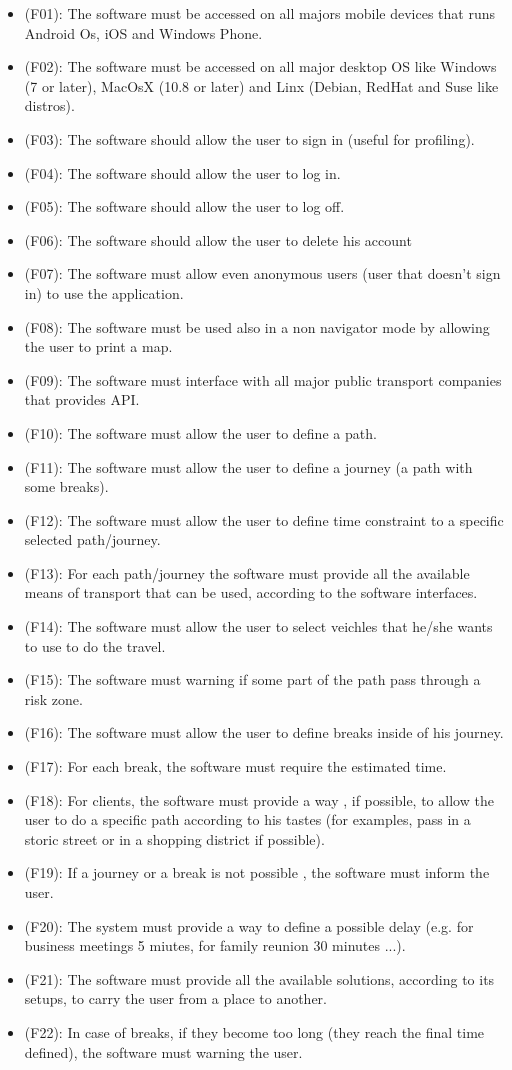 \documentclass[a4paper]{book}
\begin{document}
\begin{itemize}

\item (F01): The software must be accessed on all majors mobile devices that runs Android Os, iOS and Windows Phone.
\item (F02): The software must be accessed on all major desktop OS like Windows (7 or later), MacOsX (10.8 or later) and Linx (Debian, RedHat and Suse like distros).
\item (F03): The software should allow the user to sign in (useful for profiling).
\item (F04): The software should allow the user to log in.
\item (F05): The software should allow the user to log off.
\item (F06): The software should allow the user to delete his account
\item (F07): The software must allow even anonymous users (user that doesn't sign in) to use the application.
\item (F08): The software must be used also in a non navigator mode by allowing the user to print a map.
\item (F09): The software must interface with all major public transport companies that provides API.
\item (F10): The software must allow the user to define a path.
\item (F11): The software must allow the user to define a journey (a path with some breaks).
\item (F12): The software must allow the user to define time constraint to a specific selected path/journey.
\item (F13): For each path/journey the software must provide all the available means of transport that can be used, according to the software interfaces.
\item (F14): The software must allow the user to select veichles that he/she wants to use to do the travel.
\item (F15): The software must warning if some part of the path pass through a risk zone.
\item (F16): The software must allow the user to define breaks inside of his journey.
\item (F17): For each break, the software must require the estimated time.
\item (F18): For clients, the software must provide a way , if possible, to allow the user to do a specific path according to his tastes (for examples, pass in a storic street or in a shopping district if possible).
\item (F19): If a journey or a break is not possible , the software must inform the user.
\item (F20): The system must provide a way to define a possible delay (e.g. for business meetings 5 miutes, for family reunion 30 minutes ...).
\item (F21): The software must provide all the available solutions, according to its setups, to carry the user from a place to another.
\item (F22): In case of breaks, if they become too long (they reach the final time defined), the software must warning the user.


\end{itemize}
\end{document}
